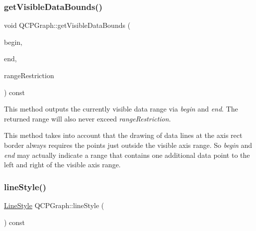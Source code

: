 \subsubsection{\texorpdfstring{getVisibleDataBounds()}{getVisibleDataBounds()}}
{\footnotesize\ttfamily void Q\+C\+P\+Graph\+::get\+Visible\+Data\+Bounds (\begin{DoxyParamCaption}\item[{\mbox{\hyperlink{class_q_c_p_data_container_ae40a91f5cb0bcac61d727427449b7d15}{Q\+C\+P\+Graph\+Data\+Container\+::const\+\_\+iterator}} \&}]{begin,  }\item[{\mbox{\hyperlink{class_q_c_p_data_container_ae40a91f5cb0bcac61d727427449b7d15}{Q\+C\+P\+Graph\+Data\+Container\+::const\+\_\+iterator}} \&}]{end,  }\item[{const \mbox{\hyperlink{class_q_c_p_data_range}{Q\+C\+P\+Data\+Range}} \&}]{range\+Restriction }\end{DoxyParamCaption}) const\hspace{0.3cm}{\ttfamily [protected]}}

This method outputs the currently visible data range via {\itshape begin} and {\itshape end}. The returned range will also never exceed {\itshape range\+Restriction}.

This method takes into account that the drawing of data lines at the axis rect border always requires the points just outside the visible axis range. So {\itshape begin} and {\itshape end} may actually indicate a range that contains one additional data point to the left and right of the visible axis range. \mbox{\label{class_q_c_p_graph_ac3e6f4b3387338df45992b47691b2551}} 
\subsubsection{\texorpdfstring{lineStyle()}{lineStyle()}}
{\footnotesize\ttfamily \mbox{\hyperlink{class_q_c_p_graph_ad60175cd9b5cac937c5ee685c32c0859}{Line\+Style}} Q\+C\+P\+Graph\+::line\+Style (\begin{DoxyParamCaption}{ }\end{DoxyParamCaption}) const\hspace{0.3cm}{\ttfamily [inline]}}

\mbox{\label{class_q_c_p_graph_a89acf99c0b52b8eecb2438adf7ec0170}} 
